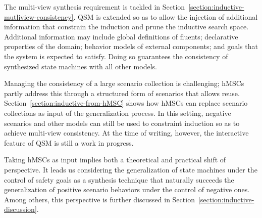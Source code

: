 The multi-view synthesis requirement is tackled in Section~\ref{section:inductive-mutliview-consistency}. QSM is extended so as to allow the injection of additional information that constrain the induction and prune the inductive search space. Additional information may include global definitions of fluents; declarative properties of the domain; behavior models of external components; and goals that the system is expected to satisfy. Doing so guarantees the consistency of synthesized state machines with all other models.

Managing the consistency of a large scenario collection is challenging; hMSCs partly address this through a structured form of scenarios that allows reuse. Section~\ref{section:inductive-from-hMSC} shows how hMSCs can replace scenario collections as input of the generalization process. In this setting, negative scenarios and other models can still be used to constraint induction so as to achieve multi-view consistency. At the time of writing, however, the interactive feature of QSM is still a work in progress.

Taking hMSCs as input implies both a theoretical and practical shift of perspective. It leads us considering the generalization of state machines under the control of safety goals as a synthesis technique that naturally succeeds the generalization of positive scenario behaviors under the control of negative ones. Among others, this perspective is further discussed in Section~\ref{section:inductive-discussion}.
